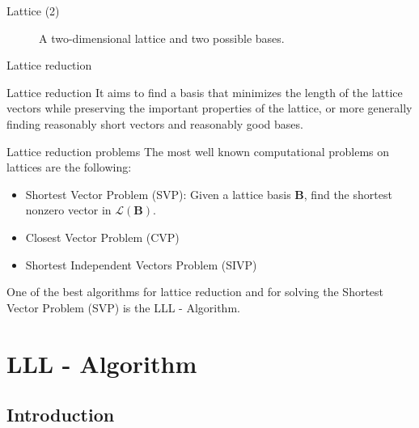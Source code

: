 \documentclass[aspectratio=169]{beamer}
\begin{document}
    \begin{frame}{Lattice (2)}
        \begin{figure}
            \centering
            
            \caption{A two-dimensional lattice and two possible bases.}
            \label{fig:lattice}
        \end{figure}
    \end{frame}

    \begin{frame}{Lattice reduction}
        \begin{block}{Lattice reduction}
            It aims to find a basis that minimizes the length of the lattice vectors while preserving the important properties of the lattice, or more generally finding reasonably short vectors and reasonably good bases.
        \end{block}
    
        \begin{block}{Lattice reduction problems}
            The most well known computational problems on lattices are the following:
            \begin{itemize}
                \item Shortest Vector Problem (SVP): Given a lattice basis $\mathbf{B}$, find the shortest nonzero vector in $\mathcal{L}(\mathbf{B})$.
                \item Closest Vector Problem (CVP)
                \item Shortest Independent Vectors Problem (SIVP)
            \end{itemize}
        \end{block}

        One of the best algorithms for lattice reduction and for solving the Shortest Vector Problem (SVP) is the LLL - Algorithm.
    \end{frame}

    \section{LLL - Algorithm}
    \subsection{Introduction}
    
\end{document}

